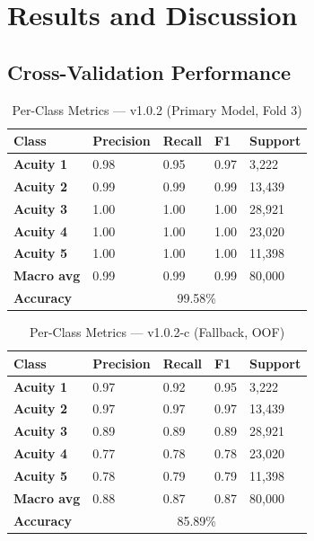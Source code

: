 \documentclass[conference]{IEEEtran}
\begin{document}
\section{Results and Discussion}

\subsection{Cross-Validation Performance}

\begin{table}[t]
\caption{Per-Class Metrics --- v1.0.2 (Primary Model, Fold 3)}
\label{tab:v102}
\renewcommand{\arraystretch}{1.2}
\begin{tabularx}{\columnwidth}{>{\bfseries}lXXXX}
\toprule
Class & Precision & Recall & F1 & Support \\
\midrule
Acuity 1 & 0.98 & 0.95 & 0.97 & 3{,}222 \\
Acuity 2 & 0.99 & 0.99 & 0.99 & 13{,}439 \\
Acuity 3 & 1.00 & 1.00 & 1.00 & 28{,}921 \\
Acuity 4 & 1.00 & 1.00 & 1.00 & 23{,}020 \\
Acuity 5 & 1.00 & 1.00 & 1.00 & 11{,}398 \\
\midrule
Macro avg & 0.99 & 0.99 & 0.99 & 80{,}000 \\
Accuracy & \multicolumn{4}{c}{99.58\%} \\
\bottomrule
\end{tabularx}
\end{table}

\begin{table}[t]
\caption{Per-Class Metrics --- v1.0.2-c (Fallback, OOF)}
\label{tab:v102c}
\renewcommand{\arraystretch}{1.2}
\begin{tabularx}{\columnwidth}{>{\bfseries}lXXXX}
\toprule
Class & Precision & Recall & F1 & Support \\
\midrule
Acuity 1 & 0.97 & 0.92 & 0.95 & 3{,}222 \\
Acuity 2 & 0.97 & 0.97 & 0.97 & 13{,}439 \\
Acuity 3 & 0.89 & 0.89 & 0.89 & 28{,}921 \\
Acuity 4 & 0.77 & 0.78 & 0.78 & 23{,}020 \\
Acuity 5 & 0.78 & 0.79 & 0.79 & 11{,}398 \\
\midrule
Macro avg & 0.88 & 0.87 & 0.87 & 80{,}000 \\
Accuracy & \multicolumn{4}{c}{85.89\%} \\
\bottomrule
\end{tabularx}
\end{table}
\end{document}

